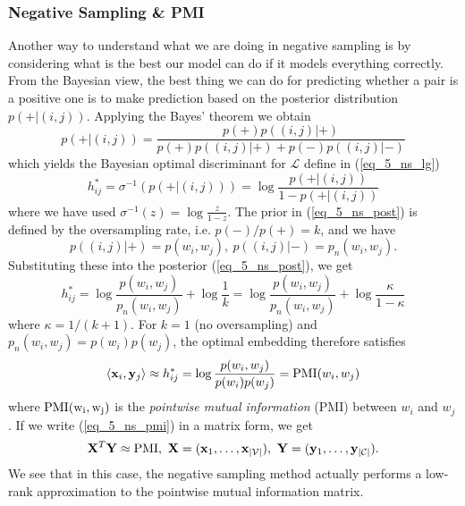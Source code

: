 \documentclass[../main.tex]{subfiles}
\begin{document}
\subsubsection{Negative Sampling \& PMI}
Another way to understand what we are doing in negative sampling is by considering what is the best our model can do if it models everything correctly. From the Bayesian view, the best thing we can do for predicting whether a pair is a positive one is to make prediction based on the posterior distribution $p(+|(i,j))$. Applying the Bayes' theorem we obtain
\begin{equation}\label{eq_5_ns_post}
p(+|(i,j)) = \frac{p(+)p((i,j)|+)}{p(+)p((i,j)|+)+p(-)p((i,j)|-)}
\end{equation}
which yields the Bayesian optimal discriminant for $\mathcal{L}$ define in (\ref{eq_5_ns_lg})
\begin{equation*}
h^*_{ij}=\sigma^{-1}(p(+|(i,j))) = \log \frac{p(+|(i,j))}{1-p(+|(i,j))}
\end{equation*}
where we have used $\sigma^{-1}(z)=\log \frac{z}{1-z}$. The prior in (\ref{eq_5_ns_post}) is defined by the oversampling rate, i.e. $p(-)/p(+)=k$, and we have
\begin{equation*}
p((i,j)|+)=p(w_i,w_j),\ p((i,j)|-)=p_n(w_i,w_j).
\end{equation*}
Substituting these into the posterior (\ref{eq_5_ns_post}), we get
\begin{equation*}
h^*_{ij}=\log\frac{p(w_i,w_j)}{p_n(w_i,w_j)}+\log \frac{1}{k} = \log\frac{p(w_i,w_j)}{p_n(w_i,w_j)}+\log \frac{\kappa}{1-\kappa}
\end{equation*}
where $\kappa=1/(k+1)$. For $k=1$ (no oversampling) and $p_n(w_i,w_j)=p(w_i)p(w_j)$, the optimal embedding therefore satisfies
\begin{equation}\label{eq_5_ns_pmi}
\langle {\bf x}_i,{\bf y}_j \rangle \approx h^*_{ij} = \log\frac{p(w_i,w_j)}{p(w_i)p(w_j)} = {\rm PMI}(w_i,w_j)
\end{equation}
where ${\rm PMI(w_i, w_j)}$ is the \emph{pointwise mutual information} (PMI) between $w_i$ and $w_j$. If we write (\ref{eq_5_ns_pmi}) in a matrix form, we get
\begin{equation*}
{\bf X}^T{\bf Y}\approx{\rm PMI},\ {\bf X}=({\bf x}_1,\dots,{\bf x}_{|\mathcal{V}|}),\ {\bf Y}=({\bf y}_1,\dots,{\bf y}_{|\mathcal{C}|}).
\end{equation*}
We see that in this case, the negative sampling method actually performs a low-rank approximation to the pointwise mutual information matrix.
\end{document}
